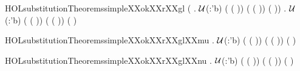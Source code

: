 \newcommand{\HOLsubstitutionTheoremssillyXXextend}{\UseVerbatim{HOLsubstitutionTheoremssillyXXextend}}
\begin{SaveVerbatim}{HOLsubstitutionTheoremssimpleXXokXXrXXgl}
\HOLTokenTurnstile{} (\HOLSymConst{\HOLTokenForall{}}  .
       \ensuremath{\cal{U}}(:'b) \HOLSymConst{\HOLTokenConj{}}   ( (  )) \HOLSymConst{\HOLTokenImp{}}
       (   ( )) ( )) \HOLSymConst{\HOLTokenConj{}}
   \HOLSymConst{\HOLTokenForall{}}  .
      \ensuremath{\cal{U}}(:'b) \HOLSymConst{\HOLTokenConj{}}   ( (  )) \HOLSymConst{\HOLTokenImp{}}
      (   ( )) ( )
\end{SaveVerbatim}
\newcommand{\HOLsubstitutionTheoremssimpleXXokXXrXXgl}{\UseVerbatim{HOLsubstitutionTheoremssimpleXXokXXrXXgl}}
\begin{SaveVerbatim}{HOLsubstitutionTheoremssimpleXXokXXrXXglXXmu}
\HOLTokenTurnstile{} \HOLSymConst{\HOLTokenForall{}}  .
      \ensuremath{\cal{U}}(:'b) \HOLSymConst{\HOLTokenConj{}}   ( (  )) \HOLSymConst{\HOLTokenImp{}}
      (   ( )) ( )
\end{SaveVerbatim}
\newcommand{\HOLsubstitutionTheoremssimpleXXokXXrXXglXXmu}{\UseVerbatim{HOLsubstitutionTheoremssimpleXXokXXrXXglXXmu}}
\begin{SaveVerbatim}{HOLsubstitutionTheoremssimpleXXokXXrXXglXXnu}
\HOLTokenTurnstile{} \HOLSymConst{\HOLTokenForall{}}  .
      \ensuremath{\cal{U}}(:'b) \HOLSymConst{\HOLTokenConj{}}   ( (  )) \HOLSymConst{\HOLTokenImp{}}
      (   ( )) ( )
\end{SaveVerbatim}

